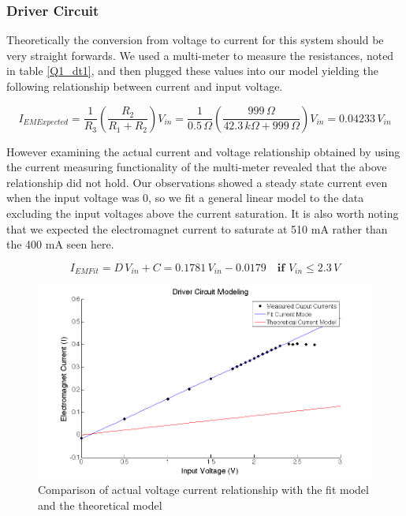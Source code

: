 \documentclass{article}
\theoremstyle{plain}
\theoremstyle{definition}
\theoremstyle{remark}
\begin{document}
\subsubsection*{Driver Circuit}

Theoretically the conversion from voltage to current for this system should be very straight forwards.  We used a multi-meter to measure the resistances, noted in table \ref{Q1_dt1}, and then plugged these values into our model yielding the following relationship between current and input voltage.

$$ I_{EM Expected}=\frac{1}{R_3}\left(\frac{R_2}{R_1+R_2}\right)V_{in} = \frac{1}{0.5 \,\Omega}\left(\frac{999 \,\Omega}{42.3 \,k\Omega + 999 \,\Omega}\right)V_{in} = 0.04233 \, V_{in}$$

However examining the actual current and voltage relationship obtained by using the current measuring functionality of the multi-meter revealed that the above relationship did not hold.  Our observations showed a steady state current even when the input voltage was 0, so we fit a general linear model to the data excluding the input voltages above the current saturation.  It is also worth noting that we expected the electromagnet current to saturate at 510 mA rather than the 400 mA seen here.

$$ I_{EM Fit} = D \, V_{in} + C = 0.1781 \, V_{in} - 0.0179  \quad \textbf{if } V_{in} \leq 2.3 \, V $$

\begin{figure}
\begin{center}
\includegraphics[width = 13cm]{DriverCircuitModel.png}
\caption{Comparison of actual voltage current relationship with the fit model and the theoretical model}
\label{Q1_d2}
\end{center}
\end{figure}
\end{document}
